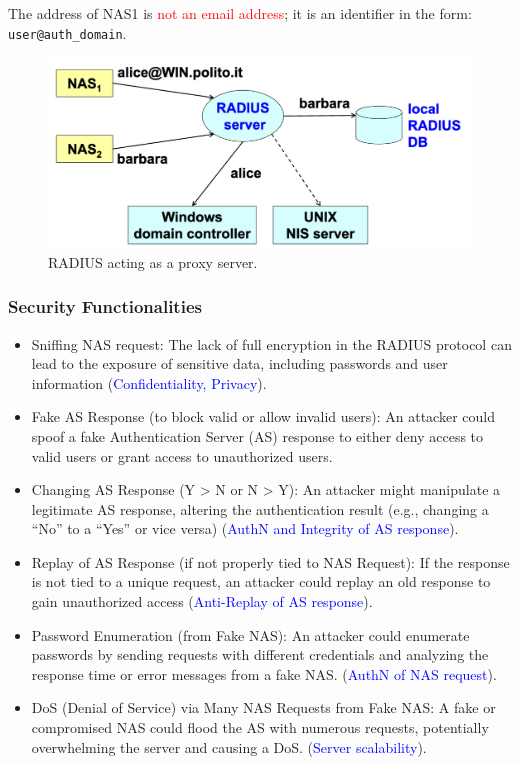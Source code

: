 The address of NAS1 is \textcolor{red}{not an email address}; it is an identifier in the form: \texttt{user@auth\_domain}.
\begin{figure}[H]
    \includegraphics[width=\linewidth]{Images/NetSec/radiusProxy.png}
    \caption{RADIUS acting as a proxy server.}
    \label{fig:RADIUS_proxy}
\end{figure}

\subsubsection{Security Functionalities}
\begin{itemize}
    \item Sniffing NAS request: The lack of full encryption in the RADIUS protocol can lead to the exposure of sensitive data, including passwords and user information (\textcolor{Blue}{Confidentiality, Privacy}).
    \item Fake AS Response (to block valid or allow invalid users): An attacker could spoof a fake Authentication Server (AS) response to either deny access to valid users or grant access to unauthorized users.
    \item Changing AS Response (Y > N or N > Y): An attacker might manipulate a legitimate AS response, altering the authentication result (e.g., changing a “No” to a “Yes” or vice versa) (\textcolor{Blue}{AuthN and Integrity of AS response}).
    \item Replay of AS Response (if not properly tied to NAS Request): If the response is not tied to a unique request, an attacker could replay an old response to gain unauthorized access (\textcolor{Blue}{Anti-Replay of AS response}).
    \item Password Enumeration (from Fake NAS): An attacker could enumerate passwords by sending requests with different credentials and analyzing the response time or error messages from a fake NAS. (\textcolor{Blue}{AuthN of NAS request}).
    \item DoS (Denial of Service) via Many NAS Requests from Fake NAS: A fake or compromised NAS could flood the AS with numerous requests, potentially overwhelming the server and causing a DoS. (\textcolor{Blue}{Server scalability}).
\end{itemize}

